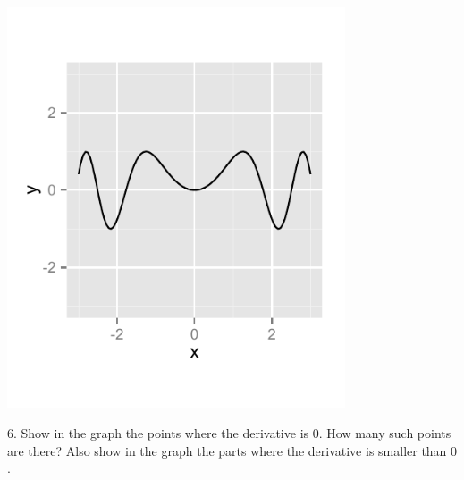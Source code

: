 \documentclass[a4paper]{report}
\begin{document}
\begin{Exercise}[title= Answer the following questions by looking at the graphs,label=ex0,difficulty=1]
\begin{minipage}{\rat\textwidth}
\includegraphics[width=0.75\textwidth]{1f.pdf}
\end{minipage}
\begin{minipage}{\rati\textwidth}
6. Show in the graph the points where the derivative is $0$. How many such points are there? Also show in the graph the parts where the derivative is smaller than $0$.
\end{minipage}
\end{Exercise}
\end{document}
